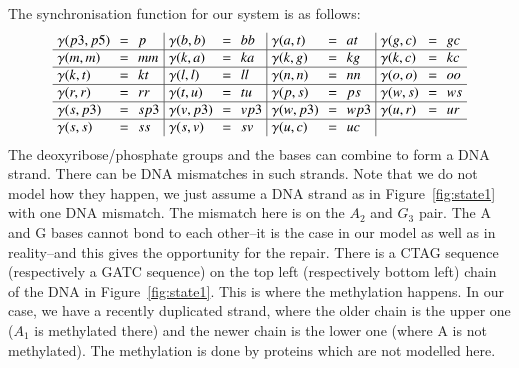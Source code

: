 The synchronisation function for our system is as follows:
%
\[\arraycolsep=3.4pt\def\arraystretch{1.0}
\begin{array}{ l c l | l c l | l c l | l c l}
\gamma(p3,p5) & = & p & \gamma(b,b) & = & bb & \gamma(a,t) & = & at &  \gamma(g,c) & = & gc \\
\hline
\gamma(m,m) & = & mm & \gamma(k,a) & = & ka & \gamma(k, g) & = & kg & \gamma(k,c) & = & kc \\
\hline
\gamma(k,t) & = & kt & \gamma(l,l) & = & ll &\gamma(n,n) & = & nn & \gamma(o,o) & = & oo\\
\hline
\gamma(r,r) & = & rr & \gamma(t,u) & = & tu &\gamma(p,s) & = & ps &\gamma(w,s) & = & ws\\
\hline
\gamma(s,p3) & = & sp3 &  \gamma(v,p3) & = & vp3 &\gamma(w,p3) & = & wp3  & \gamma(u,r) & = & ur \\
\hline
\gamma(s,s) & = & ss & \gamma(s,v) & = & sv & \gamma(u,c) &=  & uc &  \\
\end{array}
\]
The deoxyribose/phosphate groups and the bases can combine to form a DNA strand. There can be DNA mismatches in such strands. Note that we do not model how they happen, we just assume a DNA strand as in Figure~\ref{fig:state1} with one DNA mismatch. %
The mismatch here is on the $A_2$ and $G_3$ pair.
The A and G bases cannot bond to each other--it is the case in our model as well as in reality--and this gives the opportunity for the repair. There is a CTAG sequence (respectively a GATC sequence) on the top left (respectively bottom left)
chain of the DNA in Figure~\ref{fig:state1}. This is where the methylation happens. In our case, we have a recently duplicated strand, where the older chain is the upper one ($A_1$ is methylated there) and the newer chain is the lower one (where A is not methylated). The methylation is done by proteins which are not modelled here.
%
